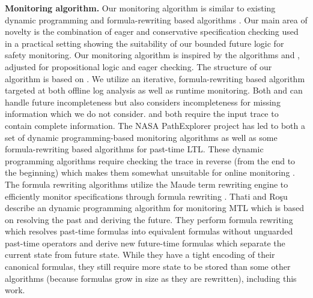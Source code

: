 
\vspace*{3pt}
\noindent
\textbf{Monitoring algorithm.}
Our monitoring algorithm is similar to existing dynamic programming and
formula-rewriting based algorithms \cite{Havelund2004,Havelund2002,Rosu2005,Thati2005,Basin2012}.
Our main area of novelty is the combination of eager and conservative specification checking used in a practical setting showing the suitability of our bounded future logic for safety monitoring.
Our monitoring algorithm is inspired by the algorithms \greduce \cite{Garg2011} and \precis \cite{Chowdhury2014}, adjusted for propositional logic and eager checking.
The structure of our algorithm is based on \greduce.
We utilize an iterative, formula-rewriting based algorithm targeted at both offline log analysis as well as runtime monitoring.
Both \greduce and \precis can handle future incompleteness but \greduce also considers incompleteness for missing information which we do not consider.
\precis and \monitor both require the input trace to contain complete information.
%
%
The NASA PathExplorer project has led to both a set of dynamic programming-based monitoring algorithms as
well as some formula-rewriting based algorithms \cite{Havelund2004} for past-time LTL.
These dynamic programming algorithms require checking the trace in reverse
(from the end to the beginning) which makes them somewhat unsuitable for online monitoring \cite{Havelund2002}.
The formula rewriting algorithms utilize the Maude term rewriting engine to efficiently monitor specifications
through formula rewriting \cite{Rosu2005}.
%
Thati and Ro\c{s}u \cite{Thati2005} describe an dynamic programming algorithm for monitoring MTL which is based on resolving the past and deriving the future.
They perform formula rewriting which resolves past-time formulas into equivalent formulas without unguarded past-time operators and derive new future-time
formulas which separate the current state from future state.
While they have a tight encoding of their canonical formulas, they still require more state to be stored than some other algorithms (because formulas
grow in size as they are rewritten), including this work.


